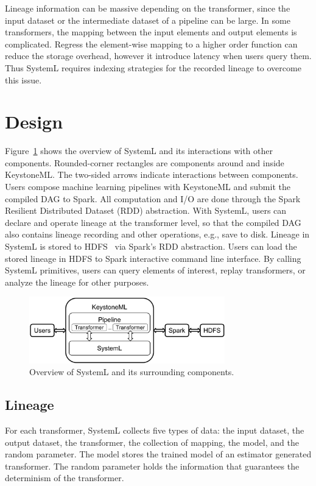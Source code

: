 \documentclass{sig-alternate}
\begin{document}
Lineage information can be massive depending on the transformer, since the input dataset or the intermediate dataset of a pipeline can be large.
In some transformers, the mapping between the input elements and output elements is complicated. 
Regress the element-wise mapping to a higher order function can reduce the storage overhead, however it introduce latency when users
query them. Thus SystemL requires indexing strategies for the recorded lineage to overcome this issue.

\section{Design}
\label{sec:Design}
Figure~\ref{fig:architecture} shows the overview of SystemL and its interactions with other components. 
Rounded-corner rectangles are components around and inside KeystoneML. 
The two-sided arrows indicate interactions between components.
Users compose machine learning pipelines with KeystoneML and submit the compiled DAG to Spark.
All computation and I/O are done through the Spark Resilient Distributed Dataset (RDD) abstraction.
With SystemL, users can declare and operate lineage at the transformer level, 
so that the compiled DAG also contains lineage recording and other operations, e.g., save to disk.
Lineage in SystemL is stored to HDFS~\cite{shvachko10} via Spark's RDD abstraction.
Users can load the stored lineage in HDFS to Spark interactive command line interface.
By calling SystemL primitives, users can query elements of interest, replay transformers, or analyze
the lineage for other purposes.

\begin{figure}[h]
\begin{center}
    \includegraphics[width=85mm]{pictures/architecture}
\caption {Overview of SystemL and its surrounding components.
    \label{fig:architecture}
}
\end{center}
\end{figure}

\subsection{Lineage}
\label{sec:Design-Lineage}
For each transformer, SystemL collects five types of data: the input dataset, the output dataset, the transformer, the collection of mapping, the model, and the random parameter.
The model stores the trained model of an estimator generated transformer.
The random parameter holds the information that guarantees the determinism of the transformer.
\end{document}
